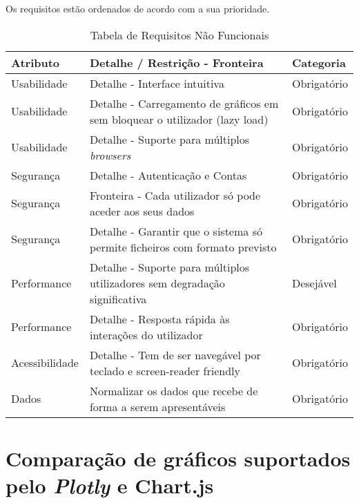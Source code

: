 Os requisitos estão ordenados de acordo com a sua prioridade.
\begin{table}[H]
    \centering
    \begin{tabular}{|l|p{7cm}|l|}
    \hline
    \textbf{Atributo} & \textbf{Detalhe / Restrição - Fronteira} & \textbf{Categoria} \\
    \hline
    Usabilidade & Detalhe - Interface intuitiva & Obrigatório \\
    Usabilidade & Detalhe - Carregamento de gráficos em sem bloquear o utilizador (lazy load) & Obrigatório \\
    Usabilidade & Detalhe - Suporte para múltiplos \textit{browsers} & Obrigatório \\
    Segurança & Detalhe - Autenticação e Contas & Obrigatório \\
    Segurança & Fronteira - Cada utilizador só pode aceder aos seus dados & Obrigatório \\
    Segurança & Detalhe - Garantir que o sistema só permite ficheiros com formato previsto & Obrigatório \\
    Performance & Detalhe - Suporte para múltiplos utilizadores sem degradação significativa & Desejável \\
    Performance & Detalhe - Resposta rápida às interações do utilizador & Obrigatório \\
    Acessibilidade & Detalhe - Tem de ser navegável por teclado e screen-reader friendly & Obrigatório \\
    Dados & Normalizar os dados que recebe de forma a serem apresentáveis & Obrigatório \\

    \hline
    \end{tabular}
    \caption{Tabela de Requisitos Não Funcionais}
    \label{tab:requisitosNaofuncionais}
    \end{table}

\chapter{Comparação de gráficos suportados pelo \textit{Plotly} e Chart.js}
\label{ch:charts}

